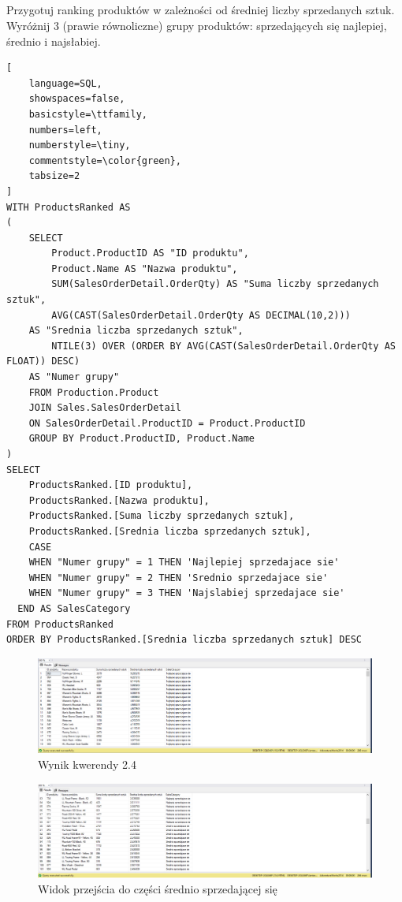 \documentclass[a4paper,12pt]{article}
\begin{document}
\subsection{}

Przygotuj ranking produktów w zależności od średniej liczby sprzedanych sztuk. Wyróżnij 3 (prawie równoliczne) grupy produktów: sprzedających się najlepiej, średnio i najsłabiej.

{\small
\begin{lstlisting}[
	language=SQL,
	showspaces=false,
	basicstyle=\ttfamily,
	numbers=left,
	numberstyle=\tiny,
	commentstyle=\color{green},
	tabsize=2
]
WITH ProductsRanked AS 
(
	SELECT 
		Product.ProductID AS "ID produktu",
		Product.Name AS "Nazwa produktu",
		SUM(SalesOrderDetail.OrderQty) AS "Suma liczby sprzedanych sztuk",
		AVG(CAST(SalesOrderDetail.OrderQty AS DECIMAL(10,2))) 
    AS "Srednia liczba sprzedanych sztuk",
		NTILE(3) OVER (ORDER BY AVG(CAST(SalesOrderDetail.OrderQty AS FLOAT)) DESC) 
    AS "Numer grupy"
	FROM Production.Product
	JOIN Sales.SalesOrderDetail 
    ON SalesOrderDetail.ProductID = Product.ProductID
	GROUP BY Product.ProductID, Product.Name
)
SELECT 
	ProductsRanked.[ID produktu],
	ProductsRanked.[Nazwa produktu],
	ProductsRanked.[Suma liczby sprzedanych sztuk],
	ProductsRanked.[Srednia liczba sprzedanych sztuk],
	CASE 
    WHEN "Numer grupy" = 1 THEN 'Najlepiej sprzedajace sie'
    WHEN "Numer grupy" = 2 THEN 'Srednio sprzedajace sie'
    WHEN "Numer grupy" = 3 THEN 'Najslabiej sprzedajace sie'
  END AS SalesCategory
FROM ProductsRanked
ORDER BY ProductsRanked.[Srednia liczba sprzedanych sztuk] DESC
\end{lstlisting}}

\begin{figure}[H]
  \centering
  \includegraphics[width=1.0\textwidth]{images/2.4.png}
  \caption{Wynik kwerendy 2.4}
\end{figure}

\begin{figure}[H]
  \centering
  \includegraphics[width=1.0\textwidth]{images/2.4_avg_selling.png}
  \caption{Widok przejścia do części średnio sprzedającej się}
\end{figure}
\end{document}
